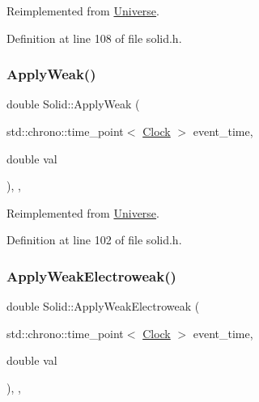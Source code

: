 Reimplemented from \mbox{\hyperlink{class_universe_af7becebb347be9a85541d96a3eca1ca7}{Universe}}.



Definition at line 108 of file solid.\+h.

\mbox{\label{class_solid_a49e35bf258104b7bce225dc21058affb}} 
\subsubsection{\texorpdfstring{Apply\+Weak()}{ApplyWeak()}}
{\footnotesize\ttfamily double Solid\+::\+Apply\+Weak (\begin{DoxyParamCaption}\item[{std\+::chrono\+::time\+\_\+point$<$ \mbox{\hyperlink{universe_8h_a0ef8d951d1ca5ab3cfaf7ab4c7a6fd80}{Clock}} $>$}]{event\+\_\+time,  }\item[{double}]{val }\end{DoxyParamCaption})\hspace{0.3cm}{\ttfamily [inline]}, {\ttfamily [final]}, {\ttfamily [virtual]}}



Reimplemented from \mbox{\hyperlink{class_universe_a6d1226b3adec3c42a833afdbb6a65a92}{Universe}}.



Definition at line 102 of file solid.\+h.

\mbox{\label{class_solid_ad6c28ec896cbcf64e24a7132a144befd}} 
\subsubsection{\texorpdfstring{Apply\+Weak\+Electroweak()}{ApplyWeakElectroweak()}}
{\footnotesize\ttfamily double Solid\+::\+Apply\+Weak\+Electroweak (\begin{DoxyParamCaption}\item[{std\+::chrono\+::time\+\_\+point$<$ \mbox{\hyperlink{universe_8h_a0ef8d951d1ca5ab3cfaf7ab4c7a6fd80}{Clock}} $>$}]{event\+\_\+time,  }\item[{double}]{val }\end{DoxyParamCaption})\hspace{0.3cm}{\ttfamily [inline]}, {\ttfamily [final]}, {\ttfamily [virtual]}}



